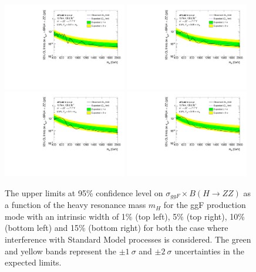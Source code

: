 \begin{figure}[h]
    \begin{center}
    \includegraphics[width=0.48\textwidth]{figures/HMHZZ/results/Limits_LWA_withInt_1.pdf}
    \includegraphics[width=0.48\textwidth]{figures/HMHZZ/results/Limits_LWA_withInt_5.pdf} \\
    \includegraphics[width=0.48\textwidth]{figures/HMHZZ/results/Limits_LWA_withInt_10.pdf}
    \includegraphics[width=0.48\textwidth]{figures/HMHZZ/results/Limits_LWA_withInt_15.pdf} \\
    \end{center}
    \caption{The upper limits at 95\% confidence level on $\sigma_{ggF} \times B(H\rightarrow ZZ)$
    as a function of the heavy resonance mass $m_{H}$ for the ggF production mode with an intrinsic width of 1\% (top left), 5\% (top right), 10\% (bottom left) and 15\% (bottom right) for both the case where interference with Standard Model processes is considered.
    The green and yellow bands represent the $\pm 1~\sigma$ and $\pm 2~\sigma$ uncertainties in the expected limits.
  }
    \label{fig:LWAlimits_ggF_201518_withInt}
\end{figure}

